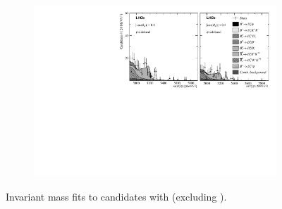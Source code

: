 \begin{figure}[!h]
\begin{subfigure}[t]{1.0\textwidth}
    \end{subfigure}
    \begin{subfigure}[t]{1.0\textwidth}
        \centering
        \includegraphics[width=1.0\textwidth]{figs/Appendix_FitCategories/canvas_DsPhiSide_Ds2KKPi_both_summed_splitHel_splitKKPi_s21_s21r1_s24_s26.pdf}\\
    \end{subfigure}
    \caption{Invariant mass fits to \decay{\Bp}{\Dsp\phiz} candidates with \decay{\Dsp}{\Kp\Km\pip} (excluding \decay{\Dsp}{\phiz\pip}).}
    \label{fig:app_fit_KKpi}
\end{figure}
